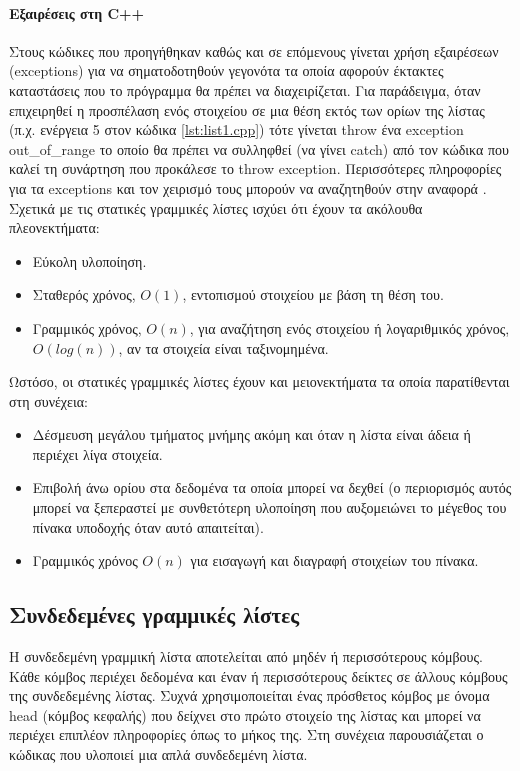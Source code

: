 \paragraph{Εξαιρέσεις στη C++} Στους κώδικες που προηγήθηκαν καθώς και σε επόμενους γίνεται χρήση εξαιρέσεων (exceptions) για να σηματοδοτηθούν γεγονότα τα οποία αφορούν έκτακτες καταστάσεις που το πρόγραμμα θα πρέπει να διαχειρίζεται. Για παράδειγμα, όταν επιχειρηθεί η προσπέλαση ενός στοιχείου σε μια θέση εκτός των ορίων της λίστας (π.χ. ενέργεια 5 στον κώδικα \ref{lst:list1.cpp}) τότε γίνεται throw ένα exception out\_of\_range το οποίο θα πρέπει να συλληφθεί (να γίνει catch) από τον κώδικα που καλεί τη συνάρτηση που προκάλεσε το throw exception. Περισσότερες πληροφορίες για τα exceptions και τον χειρισμό τους μπορούν να αναζητηθούν στην αναφορά \cite{cppexceptions}.\\

\noindent Σχετικά με τις στατικές γραμμικές λίστες ισχύει ότι έχουν τα ακόλουθα πλεονεκτήματα:
\begin{itemize}[nolistsep]
\item Εύκολη υλοποίηση. 
\item Σταθερός χρόνος, $O(1)$, εντοπισμού στοιχείου με βάση τη θέση του.
\item Γραμμικός χρόνος, $O(n)$, για αναζήτηση ενός στοιχείου ή λογαριθμικός χρόνος, $O(log(n))$, αν τα στοιχεία είναι ταξινομημένα.
\end{itemize}

\noindent Ωστόσο, οι στατικές γραμμικές λίστες έχουν και μειονεκτήματα τα οποία παρατίθενται στη συνέχεια:
\begin{itemize}[nolistsep]
\item Δέσμευση μεγάλου τμήματος μνήμης ακόμη και όταν η λίστα είναι άδεια ή περιέχει λίγα στοιχεία. 
\item Επιβολή άνω ορίου στα δεδομένα τα οποία μπορεί να δεχθεί (ο περιορισμός αυτός μπορεί να ξεπεραστεί με συνθετότερη υλοποίηση που αυξομειώνει το μέγεθος του πίνακα υποδοχής όταν αυτό απαιτείται).
\item Γραμμικός χρόνος $O(n)$ για εισαγωγή και διαγραφή στοιχείων του πίνακα.
\end{itemize}


\subsection{Συνδεδεμένες γραμμικές λίστες}
Η συνδεδεμένη γραμμική λίστα αποτελείται από μηδέν ή περισσότερους κόμβους. Κάθε κόμβος περιέχει δεδομένα και έναν ή περισσότερους δείκτες σε άλλους κόμβους της συνδεδεμένης λίστας. Συχνά χρησιμοποιείται ένας πρόσθετος κόμβος με όνομα head (κόμβος κεφαλής) που δείχνει στο πρώτο στοιχείο της λίστας και μπορεί να περιέχει επιπλέον πληροφορίες όπως το μήκος της. Στη συνέχεια παρουσιάζεται ο κώδικας που υλοποιεί μια απλά συνδεδεμένη λίστα.

